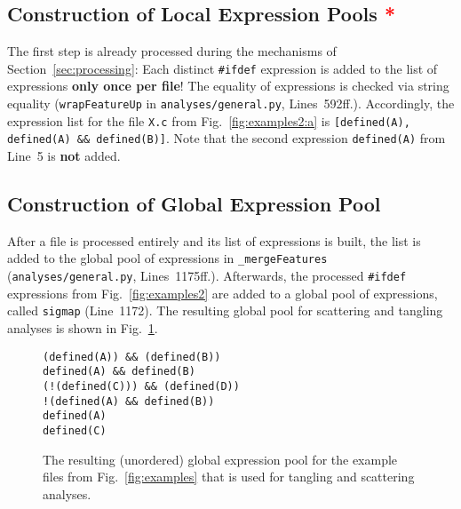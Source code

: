 \documentclass[a4paper]{scrartcl}
\newcommand\sub[1]{\textsubscript{#1}}
\newcommand\code[1]{\texttt{#1}}
\newcommand\feature[1]{\texttt{#1}}
\newcommand\metric[1]{{#1}}
\newcommand\ifdeff[1]{\code{\##1}\xspace}
\newcommand\ifdef[0]{{\upshape\ifdeff{ifdef}}\xspace}
\newcommand\affected{\textcolor{red}{*}\xspace}
\begin{document}
\subsection{Construction of Local Expression Pools \affected}

The first step is already processed during the mechanisms of Section~\ref{sec:processing}:
Each distinct \ifdef expression is added to the list of expressions \textbf{only once per file}!
The equality of expressions is checked via string equality (\code{wrapFeatureUp} in \code{analyses/general.py}, Lines~592ff.).
Accordingly, the expression list for the file \code{X.c} from Fig.\ \ref{fig:examples2:a} is \feature{[defined(A), defined(A) \&\& defined(B)]}.
Note that the second expression \feature{defined(A)} from Line~5 is \textbf{not} added.


\subsection{Construction of Global Expression Pool}

After a file is processed entirely and its list of expressions is built, the list is added to the global pool of expressions in \code{\_mergeFeatures} (\code{analyses/general.py}, Lines~1175ff.).
Afterwards, the processed \ifdef expressions from Fig.\ \ref{fig:examples2} are added to a global pool of expressions, called \code{sigmap} (Line~1172).
The resulting global pool for scattering and tangling analyses is shown in Fig.\ \ref{fig:pool}.

\begin{figure}[htp]
\begin{lstlisting}
(defined(A)) && (defined(B))
defined(A) && defined(B)
(!(defined(C))) && (defined(D))
!(defined(A) && defined(B))
defined(A)
defined(C)
\end{lstlisting}
\caption{The resulting (unordered) global expression pool for the example files from Fig.\ \ref*{fig:examples} that is used for tangling and scattering analyses.}
\label{fig:pool}
\end{figure}


%
%

\nocite{*}


\end{document}
